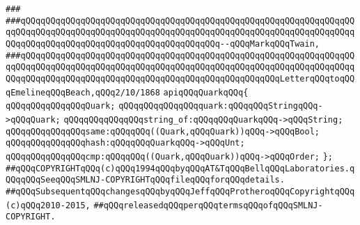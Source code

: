 \verb|###|\newline
\verb|###qQQqqQQqqQQqqQQqqQQqqQQqqQQqqQQqqQQqqQQqqQQqqQQqqQQqqQQqqQQqqQQqqQQqqQQqqQQqqQQqqQQqqQQqqQQqqQQqqQQqqQQqqQQqqQQqqQQqqQQqqQQqqQQqqQQqqQQqqQQqqQQqqQQqqQQqqQQqqQQqqQQqqQQqqQQqqQQqqQQq--qQQqMarkqQQqTwain,|\newline
\verb|###qQQqqQQqqQQqqQQqqQQqqQQqqQQqqQQqqQQqqQQqqQQqqQQqqQQqqQQqqQQqqQQqqQQqqQQqqQQqqQQqqQQqqQQqqQQqqQQqqQQqqQQqqQQqqQQqqQQqqQQqqQQqqQQqqQQqqQQqqQQqqQQqqQQqqQQqqQQqqQQqqQQqqQQqqQQqqQQqqQQqqQQqqQQqqQQqLetterqQQqtoqQQqEmelineqQQqBeach,qQQq2/10/1868|\newline
\newline
\newline
\newline
\verb|apiqQQqQuarkqQQq{|\newline
\newline
\verb|qQQqqQQqqQQqqQQqQuark;|\newline
\newline
\verb|qQQqqQQqqQQqqQQqquark:qQQqqQQqStringqQQq->qQQqQuark;|\newline
\newline
\verb|qQQqqQQqqQQqqQQqstring_of:qQQqqQQqQuarkqQQq->qQQqString;|\newline
\newline
\verb|qQQqqQQqqQQqqQQqsame:qQQqqQQq((Quark,qQQqQuark))qQQq->qQQqBool;|\newline
\newline
\verb|qQQqqQQqqQQqqQQqhash:qQQqqQQqQuarkqQQq->qQQqUnt;|\newline
\newline
\verb|qQQqqQQqqQQqqQQqcmp:qQQqqQQq((Quark,qQQqQuark))qQQq->qQQqOrder;|\newline
\newline
\verb|};|\newline
\newline
\newline
\verb|##qQQqCOPYRIGHTqQQq(c)qQQq1994qQQqbyqQQqAT&TqQQqBellqQQqLaboratories.qQQqqQQqSeeqQQqSMLNJ-COPYRIGHTqQQqfileqQQqforqQQqdetails.|\newline
\verb|##qQQqSubsequentqQQqchangesqQQqbyqQQqJeffqQQqProtheroqQQqCopyrightqQQq(c)qQQq2010-2015,|\newline
\verb|##qQQqreleasedqQQqperqQQqtermsqQQqofqQQqSMLNJ-COPYRIGHT.|\newline

